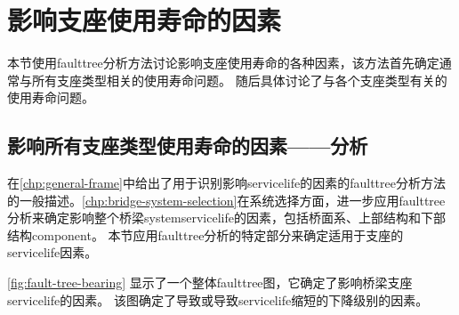 \section{影响支座使用寿命的因素}
\label{sec:factor-influence-sl-bearing}
本节使用\gls*{faulttree}分析方法讨论影响支座使用寿命的各种因素，该方法首先确定通常与所有支座类型相关的使用寿命问题。 随后具体讨论了与各个支座类型有关的使用寿命问题。

\subsection{影响所有支座类型使用寿命的因素——分析}
\label{subsec:factors-affecting-bearing}
在\cref{chp:general-frame}中给出了用于识别影响\gls*{servicelife}的因素的\gls*{faulttree}分析方法的一般描述。\cref{chp:bridge-system-selection}在系统选择方面，进一步应用\gls*{faulttree}分析来确定影响整个桥梁\gls*{system}\gls*{servicelife}的因素，包括桥面系、上部结构和下部结构\gls*{component}。 本节应用\gls*{faulttree}分析的特定部分来确定适用于支座的\gls*{servicelife}因素。

\cref{fig:fault-tree-bearing} 显示了一个整体\gls*{faulttree}图，它确定了影响桥梁支座\gls*{servicelife}的因素。 该图确定了导致或导致\gls*{servicelife}缩短的下降级别的因素。

